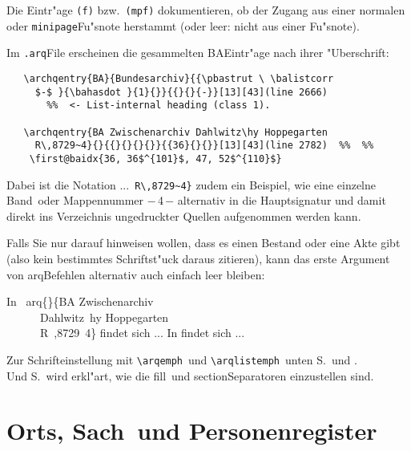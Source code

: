 \documentclass[12pt,a4paper]{article}
\newcommand{\pbs}{\string\ \unskip}
\newcommand{\bs}{\protect\pbs}
\begin{document}
\vspace{-.5ex}\noindent 
Die Eintr"age {\small\verb|(f)|} bzw.\ {\small\verb|(mpf)|} 
dokumentieren, ob der Zugang aus einer normalen oder 
\verb|minipage|\hy Fu"snote herstammt (oder leer: nicht aus 
einer Fu"snote). 

\vspace{1ex}\noindent
Im \verb|.arq|\hy File erscheinen die gesammelten BA\hy Eintr"age 
nach ihrer "Uberschrift:

\vspace{-.5ex}
{\scriptsize\begin{verbatim}
   \archqentry{BA}{Bundesarchiv}{{\pbastrut \ \balistcorr 
     $-$ }{\bahasdot }{1}{}}{{}{}{-}}[13][43](line 2666)
       %%  <- List-internal heading (class 1).

   \archqentry{BA Zwischenarchiv Dahlwitz\hy Hoppegarten 
     R\,8729~4}{}{{}{}{}{}}{{36}{}{}}[13][43](line 2782)  %%  %%
    \first@baidx{36, 36$^{101}$, 47, 52$^{110}$}
\end{verbatim}}

\vspace{-.5ex}\noindent
Dabei ist die Notation ...~\verb|R\,8729~4}| zudem ein Beispiel, wie eine 
einzelne Band\hy\ oder Mappennummer $-$\,4\,$-$ alternativ in die Hauptsignatur und damit 
direkt ins Verzeichnis ungedruckter Quellen aufgenommen werden kann.

\vspace{1ex}\noindent
Falls Sie nur darauf hinweisen wollen, dass es einen Bestand oder 
eine Akte gibt (also kein bestimmtes Schriftst"uck daraus zitieren),
kann das erste Argument von arq\hy Befehlen alternativ auch einfach 
leer bleiben:

\Doppelbox
{
In \bs arq\{\}\{BA Zwischenarchiv 
\\ \ \ \ \ \ \ Dahlwitz\bs hy Hoppegarten 
\\ \ \ \ \ \ \ R\bs ,8729\string~4\} findet sich ...
}
{
In  findet sich ...
}

\vfill\noindent
{\sffamily Zur Schrifteinstellung mit }\verb|\arqemph|{\sffamily\ 
und }\verb|\arqlistemph|{\sffamily\ unten S.\,\pageref{arqemph1} und \pageref{arqemph2}. \\
Und S.\,\pageref{Gedankenstriche} wird erkl"art, wie die 
fill\hy\ und section\hy Separatoren einzustellen sind.}


\newpage
\section{Orts\fhy, Sach\hy\ und Personenregister}\label{Sect8}
\end{document}
